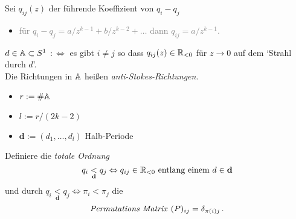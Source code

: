 \begin{defn}
  Sei $q_{ij}(z)$ der führende Koeffizient von $q_i-q_j$
  \begin{itemize}
    \item \textcolor{gray}{für $q_i-q_j=a/z^{k-1}+b/z^{k-2}+\dots$ dann
      $q_{ij}=a/z^{k-1}$.}
  \end{itemize}
  $d\in\mathbb{A}\subset S^1$
  $:\Leftrightarrow{}$
  es gibt $i\neq j$ so dass $q_{ij}(z)\in\mathbb{R}_{<0}$ für $z\to0$ auf dem `Strahl
  durch $d$'.
  \\Die Richtungen in $\mathbb{A}$ heißen \emph{anti-Stokes-Richtungen}.
\end{defn}
\begin{paracol}{2}
\switchcolumn[0]
  \begin{defn}
    \begin{itemize}
      \item $r:=\#\mathbb{A}$
      \item $l:=r/(2k-2)$
      \item $\textbf{d}:=(d_1,\dots,d_l)$ Halb-Periode
    \end{itemize}
  \end{defn}
  Definiere die \emph{totale Ordnung}
  \[
    q_i\underset{\textbf{d}}{<}q_j\Leftrightarrow{}q_{ij}\in\mathbb{R}_{<0}\text{
    entlang einem } d\in\textbf{d}
  \]
  und durch $q_i\underset{\textbf{d}}{<}q_j\Leftrightarrow{}\pi_i<\pi_j$ die
  \[
    \text{\emph{Permutations Matrix} } (P)_{ij}=\delta_{\pi(i)j} \,.
  \]
\switchcolumn[1]
  \begin{center}
\end{center}
\end{paracol}
